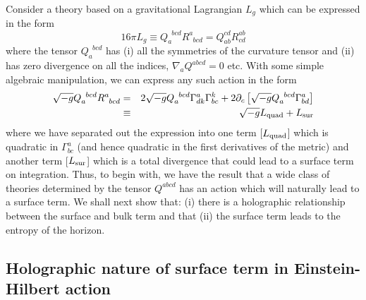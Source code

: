 \documentclass[12pt]{iopart}
\def\G#1#2#3{{\Gamma^#1_{#2#3}}}
\def\G#1#2#3{{\Gamma^#1_{#2#3}}}
\begin{document}
  
 
  Consider a theory based on a gravitational  Lagrangian $L_g$ which can be expressed in the form
  \begin{equation}
16\pi L_{g}\equiv Q_a^{\phantom{a}bcd}R^a_{\phantom{a}bcd}
= Q_{ab}^{cd}R^{ab}_{cd}
\label{lisrq}
\end{equation} 
where the tensor  $Q_a^{\phantom{a}bcd}$  has (i) all the symmetries of the curvature tensor and  (ii) has zero divergence on all the indices, $\nabla_a Q^{abcd}=0$ etc. 
With some simple algebraic manipulation, we can express \cite{ayan} any such action in the form
\begin{eqnarray}
\sqrt{-g}Q_{a}^{\phantom{a}bcd}R^{a}_{\phantom{a}bcd} &=&
2\sqrt{-g}Q_a^{\phantom{a}bcd}\Gamma^a_{dk}\Gamma^k_{bc} + 2\partial_c\left[\sqrt{-g}Q_a^{\phantom{a}bcd}\Gamma^a_{bd}\right]\nonumber\\
&\equiv&   \sqrt{-g}L_{\rm quad} + L_{\rm sur}
\label{gensq}
 \end{eqnarray} 
where we have separated out the expression into one term [$L_{\rm quad}$] which is quadratic in $\G abc$ (and hence quadratic in the first derivatives of the metric) and another term [$L_{\rm sur}$] which is a total divergence that could lead to a surface term on integration. 
Thus, to begin with, we have the result that a wide class of theories determined by the tensor $Q^{abcd}$ has an action which will naturally lead to a surface term.
We shall next show that: (i) there is a holographic relationship between the surface and bulk term and  that (ii) the surface term leads to the entropy of the horizon. 

\subsection{Holographic nature of surface term in Einstein-Hilbert action}
\end{document}
